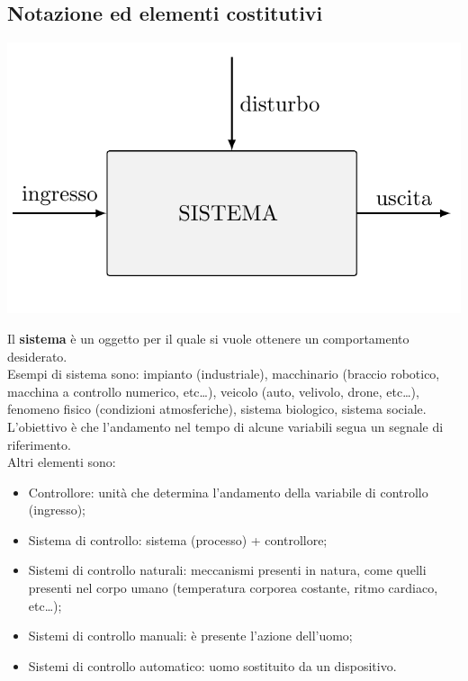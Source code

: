 \documentclass{article}
\begin{document}
\subsection{Notazione ed elementi costitutivi}
\begin{center}
    \includegraphics[scale=0.3]{Images/Schema_sistema.png}
\end{center}
Il \textbf{sistema} è un oggetto per il quale si vuole ottenere un comportamento desiderato.
\\
Esempi di sistema sono: impianto (industriale), macchinario (braccio robotico, macchina a controllo numerico, etc\dots), veicolo (auto, velivolo, drone, etc\dots), fenomeno fisico (condizioni atmosferiche), sistema biologico, sistema sociale.
\\
L'obiettivo è che l'andamento nel tempo di alcune variabili segua un segnale di riferimento.
\vspace*{0.2cm}\\
Altri elementi sono:
\begin{itemize}
    \item Controllore: unità che determina l'andamento della variabile di controllo (ingresso);
    \item Sistema di controllo: sistema (processo) + controllore;
    \item Sistemi di controllo naturali: meccanismi presenti in natura, come  quelli presenti nel corpo umano (temperatura corporea costante, ritmo cardiaco, etc\dots);
    \item Sistemi di controllo manuali: è presente l'azione dell'uomo;
    \item Sistemi di controllo automatico: uomo sostituito da un dispositivo.
\end{itemize}
\end{document}
